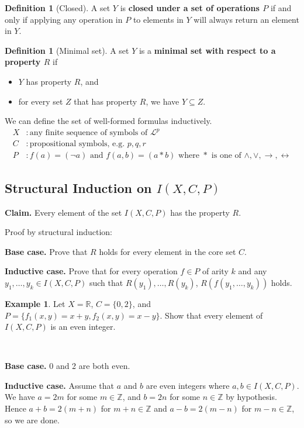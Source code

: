 \documentclass[11pt]{article}
\makeatletter
\theoremstyle{definition}
\newtheorem{defn}[thm]{Definition}
\newtheorem{exmp}[thm]{Example}
\newcommand{\Z}{\ensuremath{\mathbb{Z}}}
\newcommand{\R}{\ensuremath{\mathbb{R}}}
\newenvironment{pf}[1][\proofname]{\par
  \pushQED{\qed}%
  \normalfont \topsep0\p@\relax
  \trivlist
  \item[\hskip\labelsep\itshape
  #1\@addpunct{.}]\ignorespaces
}{%
  \popQED\endtrivlist\@endpefalse
}
\makeatother
\begin{document}
\begin{defn}[Closed]
A set $Y$ is {\bf closed under a set of operations $P$} if and only if applying any operation in $P$ to elements in $Y$ will always return an element in $Y$.
\end{defn}

\begin{defn}[Minimal set]
A set $Y$ is a {\bf minimal set with respect to a property $R$} if \vspace{-0.25cm}
\begin{itemize}
    \item $Y$ has property $R$, and
    \item for every set $Z$ that has property $R$, we have $Y \subseteq Z$.
\end{itemize}
\end{defn}

We can define the set of well-formed formulas inductively. 
\begin{align*}
    X &: \text{any finite sequence of symbols of } \mathcal{L}^p \\
    C &: \text{propositional symbols, e.g. } p, q, r \\
    P &: f(a) = (\neg a) \text{ and } f(a, b) = (a * b) \text{ where } * \text{ is one of } \wedge, \vee, \rightarrow, \leftrightarrow
\end{align*}

\subsection{Structural Induction on $I(X, C, P)$}
{\bf Claim.} Every element of the set $I(X, C, P)$ has the property $R$.
\begin{pf} Proof by structural induction:

{\bf Base case.} Prove that $R$ holds for every element in the core set $C$.

{\bf Inductive case.} Prove that for every operation $f \in P$ of arity $k$ and any $y_1, \dots, y_k \in I(X, C, P)$ such that $R(y_1), \dots, R(y_k)$, $R(f(y_1, \dots, y_k))$ holds.
\end{pf}

\begin{exmp}
Let $X = \R$, $C = \{0, 2\}$, and $P = \{f_1(x, y) = x + y, f_2(x, y) = x - y\}$. Show that every element of $I(X, C, P)$ is an even integer.
\end{exmp} 
\begin{pf}~

{\bf Base case.} 0 and 2 are both even.

{\bf Inductive case.} Assume that $a$ and $b$ are even integers where $a, b \in I(X, C, P)$. We have $a = 2m$ for some $m \in \Z$, and $b = 2n$ for some $n \in \Z$ by hypothesis. Hence $a + b = 2(m+n)$ for $m + n \in \Z$ and $a - b = 2(m - n)$ for $m - n \in \Z$, so we are done.
\end{pf}
\end{document}

